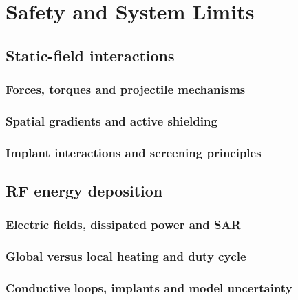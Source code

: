 \chapter{Safety and System Limits}
\label{ch:26}

\section{Static-field interactions}
\label{sec:26:static-field-interactions}
\subsection{Forces, torques and projectile mechanisms}
\subsection{Spatial gradients and active shielding}
\subsection{Implant interactions and screening principles}

\section{RF energy deposition}
\label{sec:26:rf-energy-deposition}
\subsection{Electric fields, dissipated power and SAR}
\subsection{Global versus local heating and duty cycle}
\subsection{Conductive loops, implants and model uncertainty}

